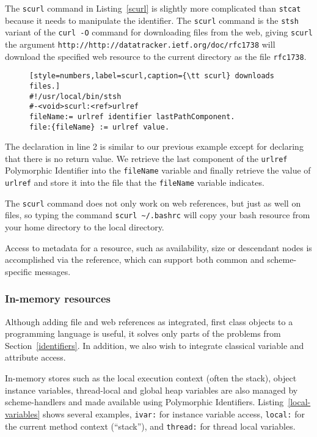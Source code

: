 \documentclass[preprint]{sigplanconf}
\begin{document}
The {\tt scurl} command in Listing~\ref{scurl} is slightly more complicated than {\tt stcat} because
it needs to manipulate the identifier.  The {\tt scurl} command
is the {\tt stsh} variant of the {\tt curl -O} command for downloading files from the web, giving 
{\tt scurl} the argument {\tt http://http://datatracker.ietf.org/doc/rfc1738} will download the specified web resource
to the current directory as the file {\tt rfc1738}.


\begin{figure}[htbp]
\begin{lstlisting}[style=numbers,label=scurl,caption={\tt scurl} downloads files.]
#!/usr/local/bin/stsh
#-<void>scurl:<ref>urlref
fileName:= urlref identifier lastPathComponent.
file:{fileName} := urlref value.
\end{lstlisting}
\end{figure}


The declaration in line 2 is similar to our previous example except for declaring that there
is no return value.   We retrieve the last component of the {\tt urlref} Polymorphic Identifier into the {\tt fileName}
variable and finally retrieve the value of  {\tt urlref} and store it into the file that
the {\tt fileName} variable indicates.

The {\tt scurl} command does not only work on web references, but just as well
on files, so typing the command {\tt scurl \~\//.bashrc} will copy your bash resource from your home directory
to the local directory.

Access to metadata for a resource, such as availability, size or descendant nodes
is accomplished via the reference, which can support both common and scheme-specific
messages.

\subsubsection{In-memory resources}
\label{inmemory}

Although adding file and web references as integrated, first class objects to a programming
language is useful, it solves only parts of the problems from Section~\ref{identifiers}.
In addition, we also wish to integrate classical variable and attribute access.

In-memory stores such as the local execution context (often the stack), object instance
variables, thread-local and global heap variables are also managed by scheme-handlers
and made available using Polymorphic Identifiers.  Listing~\ref{local-variables} shows
several examples, {\tt ivar:} for instance variable access, {\tt local:} for the current
method context (``stack''), and {\tt thread:} for thread local variables.
\end{document}
